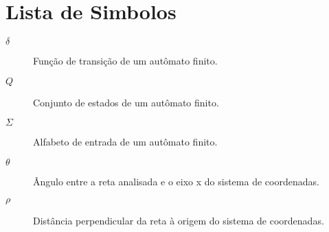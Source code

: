 \section*{Lista de Simbolos}
\begin{description}
  \item[$\delta$] Função de transição de um autômato finito.
  \item[$Q$] Conjunto de estados de um autômato finito.
  \item[$\Sigma$] Alfabeto de entrada de um autômato finito.
  \item [$\theta$] Ângulo entre a reta analisada e o eixo x do sistema de coordenadas.
  \item [$\rho$] Distância perpendicular da reta à origem do sistema de coordenadas.
\end{description}
